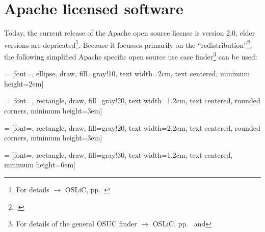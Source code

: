 %
%
%
%
%



\section{Apache licensed software}

Today, the current release of the Apache open source license is version 2.0,
elder versions are depricated\footnote{For details $\rightarrow$ OSLiC, pp.\
\pageref{sec:ProtectPowerOfApL}}. Because it focusses primarily on the
\enquote{redistribution}\footcite[cf.][\nopage wp\ §4]{Apl20OsiLicense2004a},
the following simplified Apache specific open source use case
finder\footnote{For details of the general OSUC finder $\rightarrow$ OSLiC, pp.\
\pageref{OsucTokens} and \pageref{OsucDefinitionTree}} can be used:
 
\tikzstyle{nodv} = [font=\small, ellipse, draw, fill=gray!10, 
    text width=2cm, text centered, minimum height=2em]

 = [font=\footnotesize, rectangle, draw, fill=gray!20, 
    text width=1.2cm, text centered, rounded corners, minimum height=3em]

\tikzstyle{nodb} = [font=\footnotesize, rectangle, draw, fill=gray!20, 
    text width=2.2cm, text centered, rounded corners, minimum height=3em]
    
\tikzstyle{leaf} = [font=\tiny, rectangle, draw, fill=gray!30, 
    text width=1.2cm, text centered, minimum height=6em]

